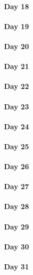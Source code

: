 \documentclass[UTF8,a4paper,8pt]{ctexart}
\begin{document}
 	 \paragraph{Day 18      \quad     }
 	 \paragraph{Day 19      \quad     }
 	 \paragraph{Day 20      \quad     }
 	 \paragraph{Day 21      \quad     }
 	 \paragraph{Day 22      \quad     }
 	 \paragraph{Day 23      \quad     }
 	 \paragraph{Day 24      \quad     }
 	 \paragraph{Day 25      \quad     }
 	 \paragraph{Day 26      \quad     }
 	 \paragraph{Day 27      \quad     }
 	 \paragraph{Day 28      \quad     }
 	 \paragraph{Day 29      \quad     }   
 	 \paragraph{Day 30      \quad     }
 	 \paragraph{Day 31      \quad     }
	
	
\end{document}
